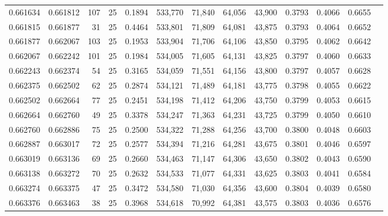 \begin{tabular}{rrrrrrrrrrrrr}
0.661634 & 0.661812 &   107 &  25 &                                     0.1894 & 533,770 &  71,840 &  64,056 &  43,900 & 0.3793 & 0.4066 & 0.6655 \\
0.661815 & 0.661877 &    31 &  25 &                                     0.4464 & 533,801 &  71,809 &  64,081 &  43,875 & 0.3793 & 0.4064 & 0.6652 \\
0.661877 & 0.662067 &   103 &  25 &                                     0.1953 & 533,904 &  71,706 &  64,106 &  43,850 & 0.3795 & 0.4062 & 0.6642 \\
0.662067 & 0.662242 &   101 &  25 &                                     0.1984 & 534,005 &  71,605 &  64,131 &  43,825 & 0.3797 & 0.4060 & 0.6633 \\
0.662243 & 0.662374 &    54 &  25 &                                     0.3165 & 534,059 &  71,551 &  64,156 &  43,800 & 0.3797 & 0.4057 & 0.6628 \\
0.662375 & 0.662502 &    62 &  25 &                                     0.2874 & 534,121 &  71,489 &  64,181 &  43,775 & 0.3798 & 0.4055 & 0.6622 \\
0.662502 & 0.662664 &    77 &  25 &                                     0.2451 & 534,198 &  71,412 &  64,206 &  43,750 & 0.3799 & 0.4053 & 0.6615 \\
0.662664 & 0.662760 &    49 &  25 &                                     0.3378 & 534,247 &  71,363 &  64,231 &  43,725 & 0.3799 & 0.4050 & 0.6610 \\
0.662760 & 0.662886 &    75 &  25 &                                     0.2500 & 534,322 &  71,288 &  64,256 &  43,700 & 0.3800 & 0.4048 & 0.6603 \\
0.662887 & 0.663017 &    72 &  25 &                                     0.2577 & 534,394 &  71,216 &  64,281 &  43,675 & 0.3801 & 0.4046 & 0.6597 \\
0.663019 & 0.663136 &    69 &  25 &                                     0.2660 & 534,463 &  71,147 &  64,306 &  43,650 & 0.3802 & 0.4043 & 0.6590 \\
0.663138 & 0.663272 &    70 &  25 &                                     0.2632 & 534,533 &  71,077 &  64,331 &  43,625 & 0.3803 & 0.4041 & 0.6584 \\
0.663274 & 0.663375 &    47 &  25 &                                     0.3472 & 534,580 &  71,030 &  64,356 &  43,600 & 0.3804 & 0.4039 & 0.6580 \\
0.663376 & 0.663463 &    38 &  25 &                                     0.3968 & 534,618 &  70,992 &  64,381 &  43,575 & 0.3803 & 0.4036 & 0.6576 \\

\end{tabular}
